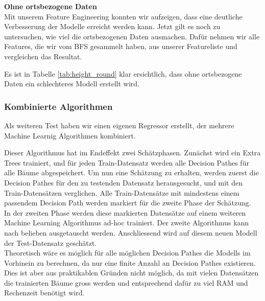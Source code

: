 \textbf{Ohne ortsbezogene Daten}\\
Mit unserem Feature Engineering konnten wir aufzeigen, dass eine deutliche Verbesserung der Modelle erreicht werden kann. Jetzt gilt es noch zu untersuchen, wie viel die ortsbezogenen Daten ausmachen. Dafür nehmen wir alle Features, die wir vom BFS gesammelt haben, aus unserer Featureliste und vergleichen das Resultat.

\begin{table}[ht]
\centering
{}
\caption{Ergebnisse ohne ortsbezogenen Daten vom BFS}
\label{tab:height_round}
\end{table}

Es ist in Tabelle \ref{tab:height_round} klar ersichtlich, dass ohne ortsbezogene Daten ein schlechteres Modell erstellt wird.

\subsubsection{Kombinierte Algorithmen}
Als weiteren Test haben wir einen eigenen Regressor erstellt, der mehrere Machine Learnig Algorithmen kombiniert.

Dieser Algorithmus hat im Endeffekt zwei Schätzphasen. Zunächst wird ein Extra Trees trainiert, und für jeden Train-Datensatz werden alle Decision Pathes für alle Bäume abgespeichert. Um nun eine Schätzung zu erhalten, werden zuerst die Decision Pathes für den zu testenden Datensatz herausgesucht, und mit den Train-Datensätzen verglichen. Alle Train-Datensätze mit mindestens einem passendem Decision Path werden markiert für die zweite Phase der Schätzung.\\
In der zweiten Phase werden diese markierten Datensätze auf einem weiteren Machine Learning Algorithmus ad-hoc trainiert. Der zweite Algorithmus kann nach belieben ausgetauscht werden. Anschliessend wird auf diesem neuen Modell der Test-Datensatz geschätzt.\\
Theoretisch wäre es möglich für alle möglichen Decision Pathes die Modells im Vorhinein zu berechnen, da nur eine finite Anzahl an Decision Pathes existieren. Dies ist aber aus praktikablen Gründen nicht möglich, da mit vielen Datensätzen die trainierten Bäume gross werden und entsprechend  dafür zu viel RAM und Rechenzeit benötigt wird.

